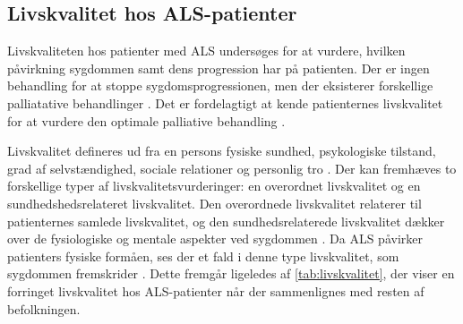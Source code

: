 \subsection{Livskvalitet hos ALS-patienter}
Livskvaliteten hos patienter med ALS undersøges for at vurdere, hvilken påvirkning sygdommen samt dens progression har på patienten. Der er ingen behandling for at stoppe sygdomsprogressionen, men der eksisterer forskellige palliatative behandlinger \citep{neudert2004}. Det er fordelagtigt at kende patienternes livskvalitet for at vurdere den optimale palliative behandling \citep{ilse2015}.

Livskvalitet defineres ud fra en persons fysiske sundhed, psykologiske tilstand, grad af selvstændighed, sociale relationer og personlig tro \citep{pagnini2013}.
\noindent
Der kan fremhæves to forskellige typer af livskvalitetsvurderinger: en overordnet livskvalitet og en sundhedshedsrelateret livskvalitet. 
Den overordnede livskvalitet relaterer til patienternes samlede livskvalitet, og den sundhedsrelaterede livskvalitet dækker over de fysiologiske og mentale aspekter ved sygdommen \citep{ilse2015, neudert2004}. Da ALS påvirker patienters fysiske formåen, ses der et fald i denne type livskvalitet, som sygdommen fremskrider \citep{ilse2015}. Dette fremgår ligeledes af \autoref{tab:livskvalitet}, der viser en forringet livskvalitet hos ALS-patienter når der sammenlignes med resten af befolkningen. 

